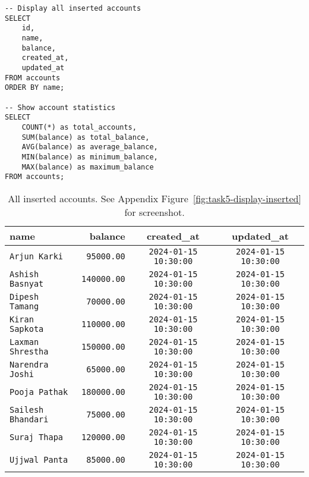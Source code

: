 \begin{verbatim}
-- Display all inserted accounts
SELECT
    id,
    name,
    balance,
    created_at,
    updated_at
FROM accounts
ORDER BY name;

-- Show account statistics
SELECT
    COUNT(*) as total_accounts,
    SUM(balance) as total_balance,
    AVG(balance) as average_balance,
    MIN(balance) as minimum_balance,
    MAX(balance) as maximum_balance
FROM accounts;
\end{verbatim}

\begin{table}[H]
  \centering
  \small
  \begin{tabular}{|l|r|c|c|}
    \hline
    \textbf{name} & \textbf{balance} & \textbf{created\_at} & \textbf{updated\_at} \\
    \hline
    \texttt{Arjun Karki} & \texttt{95000.00} & \texttt{2024-01-15 10:30:00} & \texttt{2024-01-15 10:30:00} \\
    \texttt{Ashish Basnyat} & \texttt{140000.00} & \texttt{2024-01-15 10:30:00} & \texttt{2024-01-15 10:30:00} \\
    \texttt{Dipesh Tamang} & \texttt{70000.00} & \texttt{2024-01-15 10:30:00} & \texttt{2024-01-15 10:30:00} \\
    \texttt{Kiran Sapkota} & \texttt{110000.00} & \texttt{2024-01-15 10:30:00} & \texttt{2024-01-15 10:30:00} \\
    \texttt{Laxman Shrestha} & \texttt{150000.00} & \texttt{2024-01-15 10:30:00} & \texttt{2024-01-15 10:30:00} \\
    \texttt{Narendra Joshi} & \texttt{65000.00} & \texttt{2024-01-15 10:30:00} & \texttt{2024-01-15 10:30:00} \\
    \texttt{Pooja Pathak} & \texttt{180000.00} & \texttt{2024-01-15 10:30:00} & \texttt{2024-01-15 10:30:00} \\
    \texttt{Sailesh Bhandari} & \texttt{75000.00} & \texttt{2024-01-15 10:30:00} & \texttt{2024-01-15 10:30:00} \\
    \texttt{Suraj Thapa} & \texttt{120000.00} & \texttt{2024-01-15 10:30:00} & \texttt{2024-01-15 10:30:00} \\
    \texttt{Ujjwal Panta} & \texttt{85000.00} & \texttt{2024-01-15 10:30:00} & \texttt{2024-01-15 10:30:00} \\
    \hline
  \end{tabular}
  \caption{All inserted accounts. See Appendix Figure~\ref{fig:task5-display-inserted} for screenshot.}
\end{table}

